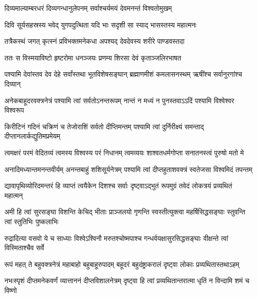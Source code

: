 \twolineshloka
{दिव्यमाल्याम्बरधरं दिव्यगन्धानुलेपनम्}
{सर्वाश्चर्यमयं देवमनन्तं विश्वतोमुखम्}%

\twolineshloka
{दिवि सूर्यसहस्रस्य भवेद् युगपदुत्थिता}
{यदि भाः सदृशी सा स्याद् भासस्तस्य महात्मनः}%

\twolineshloka
{तत्रैकस्थं जगत् कृत्स्नं प्रविभक्तमनेकधा}
{अपश्यद् देवदेवस्य शरीरे पाण्डवस्तदा}%

\twolineshloka
{ततः स विस्मयाविष्टो हृष्टरोमा धनञ्जयः}
{प्रणम्य शिरसा देवं कृताञ्जलिरभाषत}%


\fourlineindentedshloka
{पश्यामि देवांस्तव देव देहे}
{सर्वांस्तथा भूतविशेषसङ्घान्}
{ब्रह्माणमीशं कमलासनस्थम्}
{ऋषींश्च सर्वानुरगांश्च दिव्यान्}%

\fourlineindentedshloka
{अनेकबाहूदरवक्त्रनेत्रं}
{पश्यामि त्वां सर्वतोऽनन्तरूपम्}
{नान्तं न मध्यं न पुनस्तवाऽऽदिं}
{पश्यामि विश्वेश्वर विश्वरूप}%

\fourlineindentedshloka
{किरीटिनं गदिनं चक्रिणं च}
{तेजोराशिं सर्वतो दीप्तिमन्तम्}
{पश्यामि त्वां दुर्निरीक्ष्यं समन्ताद्}
{दीप्तानलार्कद्युतिमप्रमेयम्}%

\fourlineindentedshloka
{त्वमक्षरं परमं वेदितव्यं}
{त्वमस्य विश्वस्य परं निधानम्}
{त्वमव्ययः शाश्वतधर्मगोप्ता}
{सनातनस्त्वं पुरुषो मतो मे}%

\fourlineindentedshloka
{अनादिमध्यान्तमनन्तवीर्यम्}
{अनन्तबाहुं शशिसूर्यनेत्रम्}
{पश्यामि त्वां दीप्तहुताशवक्त्रं}
{स्वतेजसा विश्वमिदं तपन्तम्}%

\fourlineindentedshloka
{द्यावापृथिव्योरिदमन्तरं हि}
{व्याप्तं त्वयैकेन दिशश्च सर्वाः}
{दृष्ट्वाऽद्भुतं रूपमुग्रं तवेदं}
{लोकत्रयं प्रव्यथितं महात्मन्}%

\fourlineindentedshloka
{अमी हि त्वां सुरसङ्घा विशन्ति}
{केचिद् भीताः प्राञ्जलयो गृणन्ति}
{स्वस्तीत्युक्त्वा महर्षिसिद्धसङ्घाः}
{स्तुवन्ति त्वां स्तुतिभिः पुष्कलाभिः}%

\fourlineindentedshloka
{रुद्रादित्या वसवो ये च साध्याः}
{विश्वेऽश्विनौ मरुतश्चोष्मपाश्च}
{गन्धर्वयक्षासुरसिद्धसङ्घाः}
{वीक्षन्ते त्वां विस्मिताश्चैव सर्वे}%

\fourlineindentedshloka
{रूपं महत् ते बहुवक्त्रनेत्रं}
{महाबाहो बहुबाहूरुपादम्}
{बहूदरं बहुदंष्ट्राकरालं}
{दृष्ट्वा लोकाः प्रव्यथितास्तथाऽहम्}%

\fourlineindentedshloka
{नभःस्पृशं दीप्तमनेकवर्णं}
{व्यात्ताननं दीप्तविशालनेत्रम्}
{दृष्ट्वा हि त्वां प्रव्यथितान्तरात्मा}
{धृतिं न विन्दामि शमं च विष्णो}%

